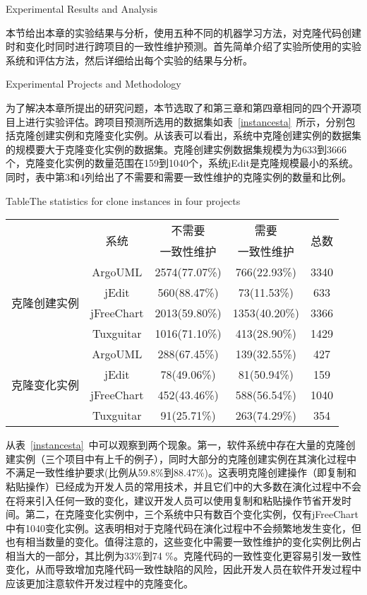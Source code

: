 
{Experimental Results and Analysis}

本节给出本章的实验结果与分析，使用五种不同的机器学习方法，对克隆代码创建时和变化时同时进行跨项目的一致性维护预测。首先简单介绍了实验所使用的实验系统和评估方法，然后详细给出每个实验的结果与分析。


{Experimental Projects and Methodology}

为了解决本章所提出的研究问题，本节选取了和第三章和第四章相同的四个开源项目上进行实验评估。跨项目预测所选用的数据集如表~\ref{instancesta}~所示，分别包括克隆创建实例和克隆变化实例。从该表可以看出，系统中克隆创建实例的数据集的规模要大于克隆变化实例的数据集。克隆创建实例数据集规模为为633到3666个，克隆变化实例的数量范围在159到1040个，系统jEdit是克隆规模最小的系统。同时，表中第3和4列给出了不需要和需要一致性维护的克隆实例的数量和比例。

\begin{table}[htbp]
{Table$\!$}{The statistics for clone instances in four projects}
\vspace{0.5em}
\centering
\wuhao
\begin{tabular}{ccccc}
\toprule[1.5pt]
~\multirow{2}{*}{类型}&\multirow{2}{*}{系统}&{不需要}&{需要} &\multirow{2}{*}{总数}\\
~&~&{一致性维护}&{一致性维护}&~\\
\midrule[1pt]
\multirow{4}{*}{克隆创建实例}
&ArgoUML&	2574(77.07\%)&	766(22.93\%)&	3340\\
&jEdit&560(88.47\%)&	73(11.53\%)&	633\\
&jFreeChart&	2013(59.80\%)&	1353(40.20\%)&	3366\\
&Tuxguitar&	1016(71.10\%)&	413(28.90\%)&	1429\\
\hline
\multirow{4}{*}{克隆变化实例}
&ArgoUML&288(67.45\%)&139(32.55\%)&427\\
&jEdit&78(49.06\%)&81(50.94\%)&159\\
&jFreeChart&452(43.46\%)&588(56.54\%)&1040\\
&Tuxguitar&91(25.71\%)&263(74.29\%)&354\\
\bottomrule[1.5pt]
\end{tabular}
\end{table}

从表~\ref{instancesta}~中可以观察到两个现象。第一，软件系统中存在大量的克隆创建实例（三个项目中有上千的例子），同时大部分的克隆创建实例在其演化过程中不满足一致性维护要求(比例从59.8\%到88.47\%)。这表明克隆创建操作（即复制和粘贴操作）已经成为开发人员的常用技术，并且它们中的大多数在演化过程中不会在将来引入任何一致的变化，建议开发人员可以使用复制和粘贴操作节省开发时间。第二，在克隆变化实例中，三个系统中只有数百个变化实例，仅有jFreeChart中有1040变化实例。这表明相对于克隆代码在演化过程中不会频繁地发生变化，但也有相当数量的变化。值得注意的，这些变化中需要一致性维护的变化实例比例占相当大的一部分，其比例为33\%到74 \%。克隆代码的一致性变化更容易引发一致性变化，从而导致增加克隆代码一致性缺陷的风险，因此开发人员在软件开发过程中应该更加注意软件开发过程中的克隆变化。


